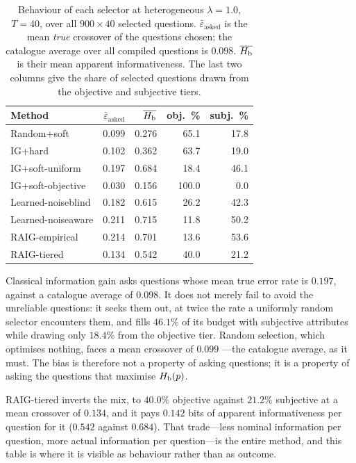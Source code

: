 \begin{table}[t]
\caption{Behaviour of each selector at heterogeneous $\lambda = 1.0$, $T=40$,
over all $900 \times 40$ selected questions.
$\bar\varepsilon_{\text{asked}}$ is the mean \emph{true} crossover of the
questions chosen; the catalogue average over all compiled questions is
$0.098$. $\overline{H_{\mathrm{b}}}$ is their mean apparent informativeness. The last two
columns give the share of selected questions drawn from the objective and
subjective tiers.}
\label{tab:asked}
\centering
\footnotesize
\begin{tabular}{@{}lrrrr@{}}
\toprule
\textbf{Method} & \textbf{$\bar\varepsilon_{\text{asked}}$} &
\textbf{$\overline{H_{\mathrm{b}}}$} & \textbf{obj.\ \%} & \textbf{subj.\ \%} \\
\midrule
Random+soft        & 0.099 & 0.276 & 65.1  & 17.8 \\
IG+hard            & 0.102 & 0.362 & 63.7  & 19.0 \\
IG+soft-uniform    & 0.197 & 0.684 & 18.4  & 46.1 \\
IG+soft-objective  & 0.030 & 0.156 & 100.0 & 0.0  \\
Learned-noiseblind & 0.182 & 0.615 & 26.2  & 42.3 \\
Learned-noiseaware & 0.211 & 0.715 & 11.8  & 50.2 \\
RAIG-empirical     & 0.214 & 0.701 & 13.6  & 53.6 \\
RAIG-tiered        & 0.134 & 0.542 & 40.0  & 21.2 \\
\bottomrule
\end{tabular}
\end{table}

Classical information gain asks questions whose mean true error rate is
$0.197$, against a catalogue average of $0.098$. It does not merely fail to
avoid the unreliable questions: it seeks them out, at twice the rate a
uniformly random selector encounters them, and fills $46.1\%$ of its budget
with subjective attributes while drawing only $18.4\%$ from the objective tier.
Random selection, which optimises nothing, faces a mean crossover of $0.099$
---the catalogue average, as it must. The bias is therefore not a property of
asking questions; it is a property of asking the questions that maximise
$H_{\mathrm{b}}(p)$.

RAIG-tiered inverts the mix, to $40.0\%$ objective against $21.2\%$ subjective
at a mean crossover of $0.134$, and it pays $0.142$ bits of apparent
informativeness per question for it ($0.542$ against $0.684$). That trade---less
nominal information per question, more actual information per question---is the
entire method, and this table is where it is visible as behaviour rather than
as outcome.


